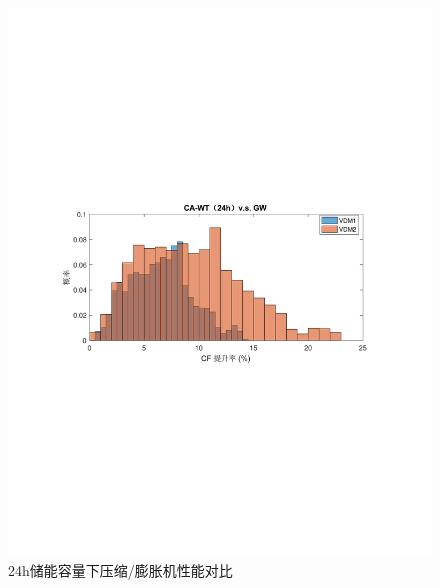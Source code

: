 \begin{figure}[H] %
  \centering
  \includegraphics[scale=0.75]{figures/Chap5-CA-WT-24h-VS-GW-China.pdf}
  \caption{24h储能容量下压缩/膨胀机性能对比}
  \label{fig:CA-WT-24h-VS-GW-China}
\end{figure}

